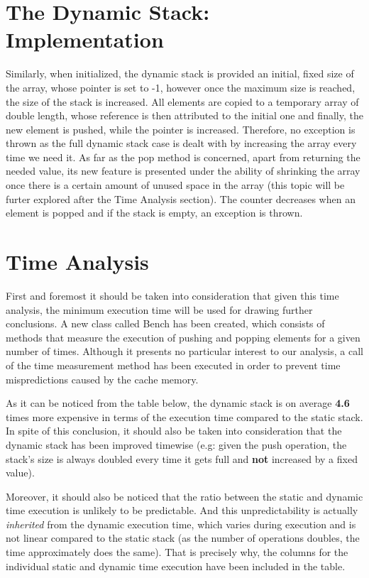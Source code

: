 \documentclass[a4paper,11pt]{article}
\begin{document}
\section*{The Dynamic Stack: Implementation}

Similarly, when initialized, the dynamic stack is provided an initial, fixed size of the array, whose pointer is set to -1, however once the maximum size is reached, 
the size of the stack is increased.
All elements are copied to a temporary array of double length, whose reference is then attributed to the initial one and finally, the new element is pushed, 
while the pointer 
is increased. Therefore, no exception is thrown as the full dynamic stack case is dealt with by increasing the array every time we need it. As far as the pop method is concerned,
apart from returning the needed value, its new feature is presented under the ability of shrinking the array once there is a certain 
amount of unused space in the array (this topic will be furter explored after the Time Analysis section). The counter decreases
when an element is popped and if the stack is empty, an exception is thrown. 

\section*{Time Analysis}

First and foremost it should be taken into consideration that given this time analysis, the minimum execution time will be used for drawing 
further conclusions. A new class called Bench has been created, which consists of methods that
measure the execution of pushing and popping elements for a given number of times. Although it presents no particular interest 
to our analysis, a call of the time measurement method has been executed in order to prevent time mispredictions caused by the cache memory. \newline

  As it can be noticed from the table below, the dynamic stack is on average \textbf{4.6} times more expensive in terms of the execution time compared
  to the static stack. In spite of this conclusion, it should also be taken into consideration that the dynamic stack has been improved timewise (e.g:   
  given the push operation, the stack's size is always doubled every time it gets full and \textbf{not} increased by a fixed value). \newline
  
  Moreover, it should also be noticed that the ratio between the static and dynamic time execution is unlikely to be predictable. And this unpredictability is
  actually \textit{inherited} from the dynamic execution time, which varies during execution and is not linear compared to the static stack 
  (as the number of operations doubles,
  the time approximately does the same). That is precisely why, the columns for the individual static and dynamic time execution have 
  been included in the 
  table.
\end{document}
